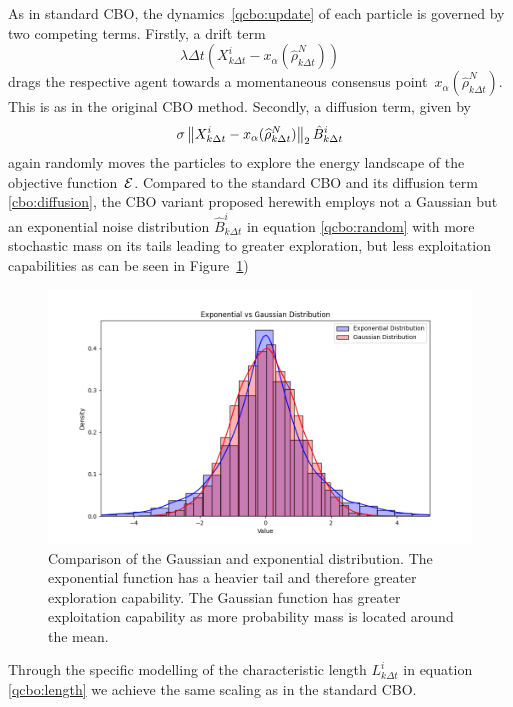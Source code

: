 \documentclass[a4paper, 11pt]{article}
\newcommand{\conspoint}[1]{x_{\alpha}({#1})}
\newcommand{\empmeasure}[1]{\widehat\rho_{#1}^N}
\begin{document}
As in standard CBO, the dynamics~\eqref{qcbo:update} of each particle is governed by two competing terms.
Firstly, a drift term
\begin{equation}
    {\lambda\Delta t} (X^i_{k\Delta t} - \conspoint{\empmeasure{k\Delta t}})
\end{equation}
drags the respective agent towards a momentaneous consensus point~$\conspoint{\empmeasure{k\Delta t}}$. This is as in the original CBO method.
Secondly, a diffusion term, given by
\begin{equation}
    \sigma \N{ X_{k\Delta t}^i-\conspoint{\empmeasure{k\Delta t}}}_2 \hat B_{k\Delta t}^i
\end{equation}
again randomly moves the particles to explore the energy landscape of the objective function~${\cal E}$. Compared to the standard CBO and its diffusion term \eqref{cbo:diffusion}, the CBO variant proposed herewith employs not a Gaussian but an exponential noise distribution $\hat B_{k\Delta t}^i$ in equation \eqref{qcbo:random} with more stochastic mass on its tails leading to greater exploration, but less exploitation capabilities as can be seen in Figure~\ref{fig:ccc}\label{gaussexp})

\begin{figure}[!ht]
\centering
\includegraphics[width=1\textwidth]{imgs/exponential_gaussian_dist.png}
\caption{Comparison of the Gaussian and exponential distribution. The exponential function has a heavier tail and therefore greater exploration capability. The Gaussian function has greater exploitation capability as more probability mass is located around the mean.} \vspace{-1em}
\label{fig:ccc}
\end{figure}
Through the specific modelling of the characteristic length $L^i_{k\Delta t}$ in equation \eqref{qcbo:length} we achieve the same scaling as in the standard CBO.
\end{document}
